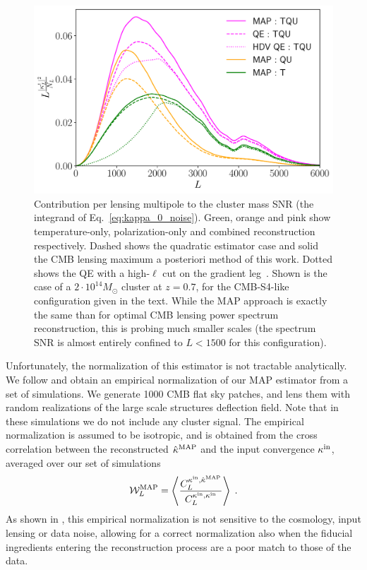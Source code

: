 \documentclass[prd, superscriptaddress, tightenlines, longbibliography, nofootinbib, eqsecnum, amsfonts, amsmath, floatfix, twocolumn, notitlepage]{revtex4-2}
\begin{document}
\begin{figure}
	\centering
	\hspace*{-1.0cm}
	\includegraphics[width=1.\hsize]{Figures/Integrand.pdf}
	\caption{Contribution per lensing multipole to the cluster mass SNR (the integrand of Eq.~\ref{eq:kappa_0_noise}). Green, orange and pink show temperature-only, polarization-only and combined reconstruction respectively. Dashed shows the quadratic estimator case and solid the CMB lensing maximum a posteriori method of this work. Dotted shows the QE with a high-$\ell$ cut on the gradient leg~\cite{Hu:2007bt}. Shown is the case of a $2\cdot 10^{14} M_\odot$ cluster at $z = 0.7$, for the CMB-S4-like configuration given in the text. While the MAP approach is exactly the same than for optimal CMB lensing power spectrum reconstruction, this is probing much smaller scales (the spectrum SNR is almost entirely confined to $L < 1500$ for this configuration).}
	\label{fig:int}
\end{figure}
Unfortunately, the normalization of this estimator is not tractable analytically. We follow \cite{Legrand:2021qdu,Legrand:2023jne} and obtain an empirical normalization of our MAP estimator from a set of simulations.
We generate 1000 CMB flat sky patches, and lens them with random realizations of the large scale structures deflection field. Note that in these simulations we do not include any cluster signal. The empirical normalization is assumed to be isotropic, and is obtained from the cross correlation between the reconstructed $\hat \kappa^{\rm MAP}$ and the input convergence $\kappa^{\rm in}$, averaged over our set of simulations
\begin{equation}
    \mathcal{W}^{\rm MAP}_L = \left< \frac{C_L^{\kappa^{\rm in}, \hat \kappa^{\rm MAP}}}{C_L^{\kappa^{\rm in}, \kappa^{\rm in}}} \right> \; .
\end{equation}
As shown in \cite{Legrand:2021qdu,Legrand:2023jne}, this empirical normalization is not sensitive to the cosmology, input lensing or data noise, allowing for a correct normalization also when the fiducial ingredients entering the reconstruction process are a poor match to those of the data.
\end{document}
